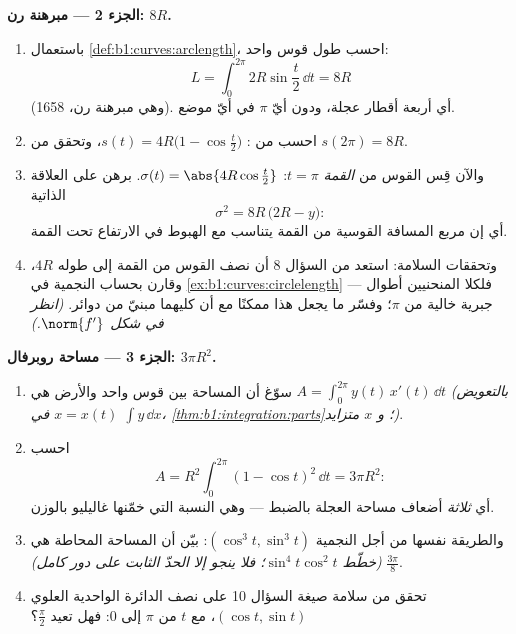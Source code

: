 \begin{problem}
\medskip
\noindent\textbf{الجزء 2 --- مبرهنة رن: 
$8R$.}
\begin{enumerate}[resume]
  \item باستعمال \cref{def:b1:curves:arclength}، احسب طول
        قوس واحد:
        \[
        L = \int_0^{2\pi} 2R\sin\frac t2\,\dd t = 8R
        \]
        (وهي مبرهنة رن، 1658). أي أربعة أقطار عجلة، ودون أيّ
        $\pi$ في أيّ موضع.
  \item احسب  من : $s(t) =
        4R\bigl(1 - \cos\frac t2\bigr)$، وتحقق من $s(2\pi) =
        8R$.
  \item والآن قِس القوس من \emph{القمة} $t = \pi$:
        $\sigma(t) = \abs{4R\cos\frac t2}$. برهن على العلاقة
        الذاتية
        \[
        \sigma^2 = 8R\,\bigl(2R - y\bigr) :
        \]
        أي إن مربع المسافة القوسية من القمة يتناسب مع
        الهبوط في الارتفاع تحت القمة.
  \item وتحققات السلامة: استعد من السؤال 8 أن نصف القوس
        من القمة إلى  طوله $4R$، وقارن بحساب
        النجمية في \cref{ex:b1:curves:circlelength}
        --- فلكلا المنحنيين أطوال جبرية خالية من $\pi$؛
        وفسّر ما يجعل هذا ممكنًا مع أن كليهما
        مبنيّ من دوائر. \emph{(انظر في شكل
        $\norm{f'}$.)}
\end{enumerate}

\medskip
\noindent\textbf{الجزء 3 --- مساحة روبرفال: $3\pi R^2$.}
\begin{enumerate}[resume]
  \item سوّغ أن المساحة بين قوس واحد والأرض هي
        $A = \int_0^{2\pi} y(t)\,x'(t)\,\dd t$ \emph{(بالتعويض
        $x = x(t)$ في $\int y\,\dd x$،
        \cref{thm:b1:integration:parts}؛ و $x$ متزايد)}.
  \item احسب
        \[
        A = R^2\int_0^{2\pi}(1 - \cos t)^2\,\dd t = 3\pi R^2 :
        \]
        أي \emph{ثلاثة} أضعاف مساحة العجلة بالضبط ---
        وهي النسبة التي خمّنها غاليليو بالوزن.
  \item والطريقة نفسها من أجل النجمية $(\cos^3t, \sin^3t)$: بيّن
        أن المساحة المحاطة هي $\frac{3\pi}8$
        \emph{(خطّط $\sin^4 t\cos^2 t$؛ فلا ينجو إلا الحدّ
        الثابت على دور كامل)}.
  \item تحقق من سلامة صيغة السؤال 10 على نصف الدائرة الواحدية
        العلوي $(\cos t, \sin t)$، مع $t$ من $\pi$ إلى $0$:
        فهل تعيد $\frac\pi2$؟
\end{enumerate}


\end{problem}
